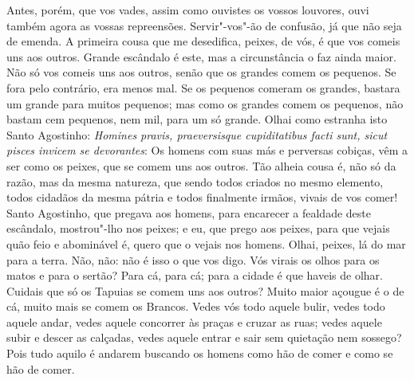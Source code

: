 Antes, porém, que vos vades, assim como ouvistes os vossos louvores,
ouvi também agora as vossas repreensões. Servir"-vos"-ão de confusão, já
que não seja de emenda. A primeira cousa que me desedifica, peixes, de
vós, é que vos comeis uns aos outros. Grande escândalo é este, mas a
circunstância o faz ainda maior. Não só vos comeis uns aos outros, senão
que os grandes comem os pequenos. Se fora pelo contrário, era menos mal.
Se os pequenos comeram os grandes, bastara um grande para muitos
pequenos; mas como os grandes comem os pequenos, não bastam cem
pequenos, nem mil, para um só grande. Olhai como estranha isto Santo
Agostinho: \emph{Homines pravis, praeversisque cupiditatibus facti sunt,
sicut pisces invicem se devorantes}: Os homens com suas más e perversas
cobiças, vêm a ser como os peixes, que se comem uns aos outros. Tão
alheia cousa é, não só da razão, mas da mesma natureza, que sendo todos
criados no mesmo elemento, todos cidadãos da mesma pátria e todos
finalmente irmãos, vivais de vos comer! Santo Agostinho, que pregava aos
homens, para encarecer a fealdade deste escândalo, mostrou"-lho nos
peixes; e eu, que prego aos peixes, para que vejais quão feio e
abominável é, quero que o vejais nos homens.
Olhai, peixes, lá do mar para a terra. Não, não: não é isso o que vos
digo. Vós virais os olhos para os matos e para o sertão? Para cá, para
cá; para a cidade é que haveis de olhar. Cuidais que só os Tapuias se
comem uns aos outros? Muito maior açougue é o de cá, muito mais se comem
os Brancos. Vedes vós todo aquele bulir, vedes todo aquele andar, vedes
aquele concorrer às praças e cruzar as ruas; vedes aquele subir e descer
as calçadas, vedes aquele entrar e sair sem quietação nem sossego? Pois
tudo aquilo é andarem buscando os homens como hão de comer e como se hão
de comer.

